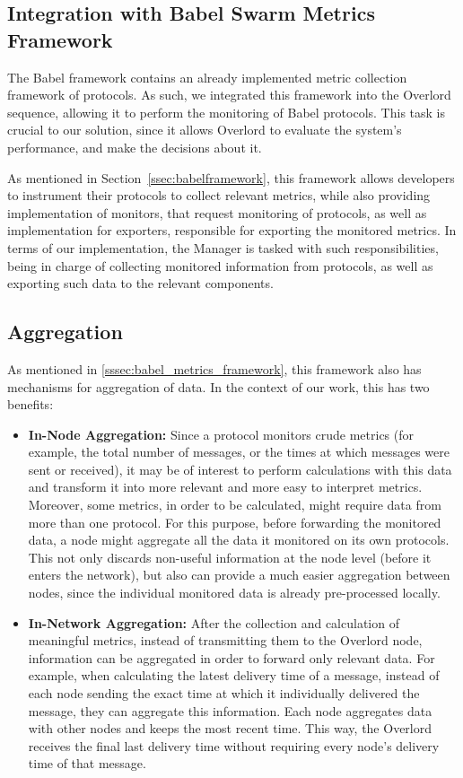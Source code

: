 \subsection{Integration with Babel Swarm Metrics Framework}
\label{ssec:integration_with_babel_metrics_framework}

The Babel framework\cite{Fouto2022} contains an already implemented metric collection framework of protocols\cite{Paulico2025}. As such, we integrated this framework into the Overlord sequence, allowing it to perform the monitoring of Babel protocols. This task is crucial to our solution, since it allows Overlord to evaluate the system's performance, and make the decisions about it.

As mentioned in Section~\ref{ssec:babelframework}, this framework allows developers to instrument their protocols to collect relevant metrics, while also providing implementation of monitors, that request monitoring of protocols, as well as implementation for exporters, responsible for exporting the monitored metrics. In terms of our implementation, the Manager is tasked with such responsibilities, being in charge of collecting monitored information from protocols, as well as exporting such data to the relevant components.

\subsection{Aggregation}
\label{ssec:aggregation}

As mentioned in \ref{sssec:babel_metrics_framework}, this framework also has mechanisms for aggregation of data. In the context of our work, this has two benefits:
\begin{itemize}
    \item \textbf{In-Node Aggregation:} Since a protocol monitors crude metrics (for example, the total number of messages, or the times at which messages were sent or received), it may be of interest to perform calculations with this data and transform it into more relevant and more easy to interpret metrics. Moreover, some metrics, in order to be calculated, might require data from more than one protocol. For this purpose, before forwarding the monitored data, a node might aggregate all the data it monitored on its own protocols. This not only discards non-useful information at the node level (before it enters the network), but also can provide a much easier aggregation between nodes, since the individual monitored data is already pre-processed locally.
    \item \textbf{In-Network Aggregation:} After the collection and calculation of meaningful metrics, instead of transmitting them to the Overlord node, information can be aggregated in order to forward only relevant data. For example, when calculating the latest delivery time of a message, instead of each node sending the exact time at which it individually delivered the message, they can aggregate this information. Each node aggregates data with other nodes and keeps the most recent time. This way, the Overlord receives the final last delivery time without requiring every node's delivery time of that message.
\end{itemize}


